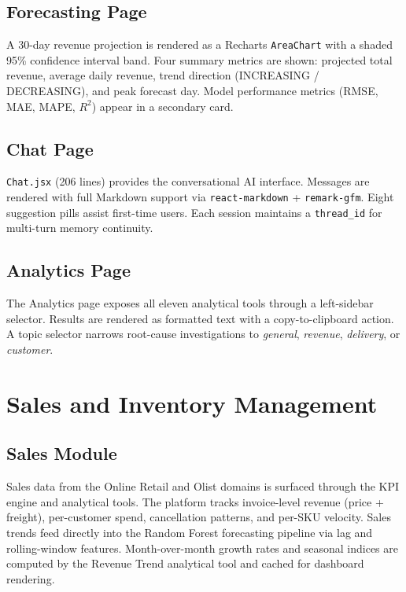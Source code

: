 \documentclass[conference]{IEEEtran}
\begin{document}
\subsection{Forecasting Page}

A 30-day revenue projection is rendered as a Recharts \texttt{AreaChart} with a shaded
95\% confidence interval band.  Four summary metrics are shown: projected total revenue,
average daily revenue, trend direction (INCREASING / DECREASING), and peak forecast day.
Model performance metrics (RMSE, MAE, MAPE, $R^2$) appear in a secondary card.

\subsection{Chat Page}

\texttt{Chat.jsx} (206 lines) provides the conversational AI interface.  Messages are
rendered with full Markdown support via \texttt{react-markdown} + \texttt{remark-gfm}.
Eight suggestion pills assist first-time users.  Each session maintains a \texttt{thread\_id}
for multi-turn memory continuity.

\subsection{Analytics Page}

The Analytics page exposes all eleven analytical tools through a left-sidebar selector.
Results are rendered as formatted text with a copy-to-clipboard action.  A topic
selector narrows root-cause investigations to \textit{general}, \textit{revenue},
\textit{delivery}, or \textit{customer}.

\section{Sales and Inventory Management}

\subsection{Sales Module}

Sales data from the Online Retail and Olist domains is surfaced through the KPI engine
and analytical tools.  The platform tracks invoice-level revenue (price + freight),
per-customer spend, cancellation patterns, and per-SKU velocity.  Sales trends feed
directly into the Random Forest forecasting pipeline via lag and rolling-window features.
Month-over-month growth rates and seasonal indices are computed by the Revenue Trend
analytical tool and cached for dashboard rendering.
\end{document}
